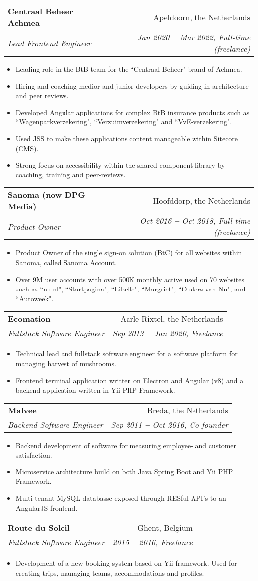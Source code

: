 \documentclass[letterpaper,11pt]{article}
\makeatletter
\newcommand{\resumeItem}[1]{
  \item\small{
    {#1 \vspace{-2pt}}
  }
}
\newcommand{\resumeSubheading}[4]{
  \vspace{-2pt}\item
    \begin{tabular*}{0.97\textwidth}[t]{l@{\extracolsep{\fill}}r}
      \textbf{#1} & #2 \\
      \textit{\small#3} & \textit{\small #4} \\
    \end{tabular*}\vspace{-7pt}
}
\newcommand{\resumeItemListStart}{\begin{itemize}}
\newcommand{\resumeItemListEnd}{\end{itemize}\vspace{-5pt}}
\makeatother
\begin{document}
    \resumeSubheading
      {Centraal Beheer Achmea}{Apeldoorn, the Netherlands}
      {Lead Frontend Engineer}{Jan 2020 \textbf{--} Mar 2022, Full-time (freelance)}
        \resumeItemListStart
            \resumeItem{Leading role in the BtB-team for the ``Centraal Beheer"-brand of Achmea.}
            \resumeItem{Hiring and coaching medior and junior developers by guiding in architecture and peer reviews.}
            \resumeItem{Developed Angular applications for complex BtB insurance products such as ``Wagenparkverzekering", ``Verzuimverzekering" and ``VvE-verzekering".}
            \resumeItem{Used JSS to make these applications content manageable within Sitecore (CMS).}
            \resumeItem{Strong focus on accessibility within the shared component library by coaching, training and peer-reviews.}
        \resumeItemListEnd

    \resumeSubheading
      {Sanoma (now DPG Media)}{Hoofddorp, the Netherlands}
      {Product Owner}{Oct 2016 \textbf{--} Oct 2018, Full-time (freelance)}
          \resumeItemListStart
              \resumeItem{Product Owner of the single sign-on solution (BtC) for all websites within Sanoma, called Sanoma Account.}
              \resumeItem{Over 9M user accounts with over 500K monthly active used on 70 websites such as ``nu.nl", ``Startpagina", ``Libelle", ``Margriet", ``Ouders van Nu", and ``Autoweek".}
          \resumeItemListEnd
    
    \resumeSubheading
      {Ecomation}{Aarle-Rixtel, the Netherlands}
      {Fullstack Software Engineer}{Sep 2013 \textbf{--} Jan 2020, Freelance}
        \resumeItemListStart
            \resumeItem{Technical lead and fullstack software engineer for a software platform for managing harvest of mushrooms.}
            \resumeItem{Frontend terminal application written on Electron and Angular (v8) and a backend application written in Yii PHP Framework.}
        \resumeItemListEnd

    \newpage
    \resumeSubheading
        {Malvee}{Breda, the Netherlands}
        {Backend Software Engineer}{Sep 2011 \textbf{--} Oct 2016, Co-founder}
          \resumeItemListStart
              \resumeItem{Backend development of software for measuring employee- and customer satisfaction.}
              \resumeItem{Microservice architecture build on both Java Spring Boot and Yii PHP Framework.}
              \resumeItem{Multi-tenant MySQL databasse exposed through RESful API's to an AngularJS-frontend.}
          \resumeItemListEnd

    \resumeSubheading
          {Route du Soleil}{Ghent, Belgium}
          {Fullstack Software Engineer}{2015 \textbf{--} 2016, Freelance}
            \resumeItemListStart
                \resumeItem{Development of a new booking system based on Yii framework. Used for creating trips, managing teams, accommodations and profiles.}
            \resumeItemListEnd
\end{document}
